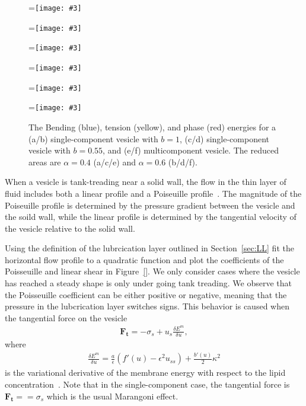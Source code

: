 \documentclass[twoside,twocolumn,9pt]{article}
\renewcommand{\tt}{\mathbf{t}}
\newcommand{\subfigimg}[3][,]{%
  \setbox1=\hbox{\texttt{[image: \#3]}}%
  \leavevmode\rlap{\usebox1}%
  \rlap{\hspace*{0pt}\raisebox{\dimexpr\ht1-0\baselineskip}{\bf
  \normalsize #2}}%
  \phantom{\usebox1}%
}
\begin{document}
\begin{figure}
  \begin{minipage}{0.49\columnwidth}
    \centering
    \subfigimg[width=\textwidth]{(a)}{figures/Fig13a.pdf}
    \subfigimg[width=\textwidth]{(c)}{figures/Fig13c.pdf}
    \subfigimg[width=\textwidth]{(e)}{figures/Fig13e.pdf}
  \end{minipage}
  \hfill
  \begin{minipage}{0.49\columnwidth}
    \centering
    \subfigimg[width=\textwidth]{(b)}{figures/Fig13b.pdf}
    \subfigimg[width=\textwidth]{(d)}{figures/Fig13d.pdf}
    \subfigimg[width=\textwidth]{(f)}{figures/Fig13f.pdf}
  \end{minipage}
  \caption{\label{fig:Energy} \small The Bending (blue), tension
  (yellow), and phase (red) energies for a (a/b) single-component
  vesicle with $b=1$, (c/d) single-component vesicle with $b = 0.55$,
  and (e/f) multicomponent vesicle. The reduced areas are $\alpha = 0.4$
  (a/c/e) and $\alpha = 0.6$ (b/d/f).}
\end{figure}

When a vesicle is tank-treading near a solid wall, the flow in the thin
layer of fluid includes both a linear profile and a Poiseuille
profile~\cite{mis-wis-ber-key-li-tun-law-per-erd-zha-zha-sun-kal-lam-kon2019}.
The magnitude of the Poiseuille profile is determined by the pressure
gradient between the vesicle and the soild wall, while the linear
profile is determined by the tangential velocity of the vesicle relative
to the solid wall.

Using the definition of the lubrcication layer outlined in
Section~\ref{sec:LL} fit the horizontal flow profile to a quadratic
function and plot the coefficients of the Poisseuille and linear shear
in Figure~\ref{}. We only consider cases where the vesicle has reached a
steady shape is only under going tank treading. We observe that the
Poisseuille coefficient can be either positive or negative, meaning that
the pressure in the lubcrication layer switches signs. This behavior is
caused when the tangential force on the vesicle
\begin{align}
  \mathbf{F}_{\tt} = -\sigma_s + u_s \frac{\delta E^m}{\delta u},
\end{align}
where
\begin{align}
  \frac{\delta E^m}{\delta u} = \frac{a}{\epsilon} 
    (f'(u) - \epsilon^2 u_{ss}) + \frac{b'(u)}{2} \kappa^2
\end{align}
is the variational derivative of the membrane energy with respect to the
lipid concentration~\cite{soh-tse-li-voi-low2010}. Note that in the
single-component case, the tangential force is $\mathbf{F}_\tt =
=\sigma_s$ which is the usual Marangoni effect.
\end{document}
